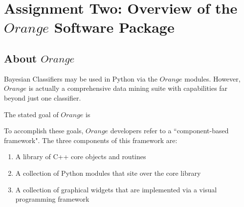 
\graphicspath{{C:/Local_Files/GitHub/MCS507_Final_Project/tex/include/}}

\section{Assignment Two: Overview of the $Orange$ Software Package} %

\subsection{About $Orange$} %

\begin{flushleft}Bayesian Classifiers may be used in Python via the $Orange$ modules. However, $Orange$ is actually a comprehensive data mining suite with capabilities far beyond just one classifier.
\end{flushleft}

\begin{flushleft}The stated goal of $Orange$ is  
\end{flushleft}

\begin{flushleft}To accomplish these goals, $Orange$ developers refer to a ``component-based framework". The three components of this framework are:
\end{flushleft}
\begin{enumerate}
\item A library of C++ core objects and routines
\item A collection of Python modules that site over the core library
\item A collection of graphical widgets that are implemented via a visual programming framework
\end{enumerate}

